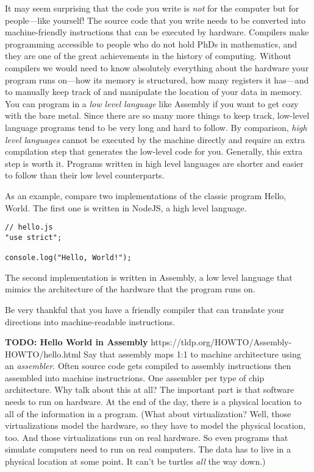 It may seem surprising that the code you write is \emph{not} for the computer
but for people---like yourself! The source code that you write needs to be
converted into machine-friendly instructions that can be executed by hardware.
Compilers make programming accessible to people who do not hold PhDs in
mathematics, and they are one of the great achievements in the history of
computing. Without compilers we would need to know absolutely everything about
the hardware your program runs on---how its memory is structured, how many
registers it has---and to manually keep track of and manipulate the location of
your data in memory. You can program in a \emph{low level language} like
Assembly if you want to get cozy with the bare metal. Since there are so many
more things to keep track, low-level language programs tend to be very long and
hard to follow. By comparison, \emph{high level languages} cannot be executed by
the machine directly and require an extra compilation step that generates the
low-level code for you. Generally, this extra step is worth it. Programs written
in high level languages are shorter and easier to follow than their low level
counterparts.

As an example, compare two implementations of the classic program \textsf{Hello,
World}. The first one is written in NodeJS, a high level language.

\begin{lstlisting}[caption={\label{listing:intro-hello-world-nodejs} Hello,
World! in NodeJS.}, escapeinside=$$, firstnumber=1]
// hello.js
"use strict";

console.log("Hello, World!");
\end{lstlisting}

The second implementation is written in Assembly, a low level language that
mimics the architecture of the hardware that the program runs on.

Be very thankful that you have a friendly compiler that can translate your
directions into machine-readable instructions.

\textbf{TODO: Hello World in Assembly}
https://tldp.org/HOWTO/Assembly-HOWTO/hello.html Say that assembly maps 1:1 to
machine architecture using an \emph{assembler}. Often source code gets compiled
to assembly instructions then assembled into machine instructrions. One
assembler per type of chip architecture. Why talk about this at all? The
important part is that software needs to run on hardware. At the end of the day,
there is a physical location to all of the information in a program. (What about
virtualization? Well, those virtualizations model the hardware, so they have to
model the physical location, too. And those virtualizations run on real
hardware. So even programs that simulate computers need to run on real
computers. The data has to live in a physical location at some point. It can't
be turtles \emph{all} the way down.)

